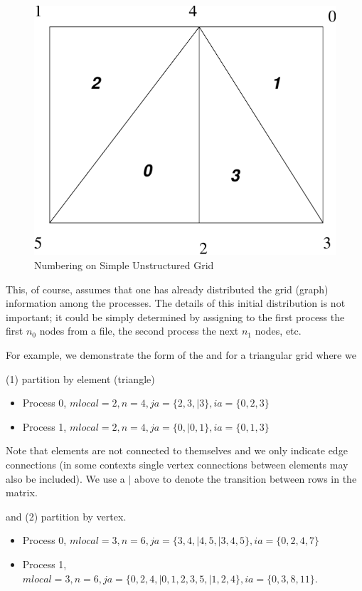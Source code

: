 \begin{figure}[H]
\centerline{ \includegraphics{usg.pdf}}
\caption{Numbering on Simple Unstructured Grid}
\label{fig_usg}
\end{figure}

This, of course, assumes that one has already distributed the grid (graph) information
among the processes. The details of this initial distribution is not important; it
could be simply determined by assigning to the first process the first $n_0$ nodes
from a file, the second process the next $ n_1$ nodes, etc.

For example, we demonstrate the form of the  and  for a triangular
grid where we

(1) partition by element (triangle)
\begin{itemize}
  \item Process 0, $ mlocal = 2, n = 4, ja = \{2, 3,| 3\}, ia = \{0, 2, 3\} $
  \item Process 1, $ mlocal = 2, n = 4, ja = \{0, | 0, 1\}, ia = \{0, 1, 3\} $
\end{itemize}
Note that elements are not connected to themselves and we only indicate edge connections
(in some contexts single vertex connections between elements may also be included). We use a
$ | $ above to denote the transition between rows in the matrix.

and (2) partition by vertex.
\begin{itemize}
  \item Process 0, $ mlocal = 3, n = 6, ja = \{3, 4, | 4, 5, | 3, 4, 5\}, ia = \{0, 2, 4, 7\} $
  \item Process 1, $ mlocal = 3, n = 6, ja = \{0, 2, 4, |  0, 1, 2, 3, 5,|  1, 2, 4\}, ia = \{0, 3, 8, 11\}. $
\end{itemize}



